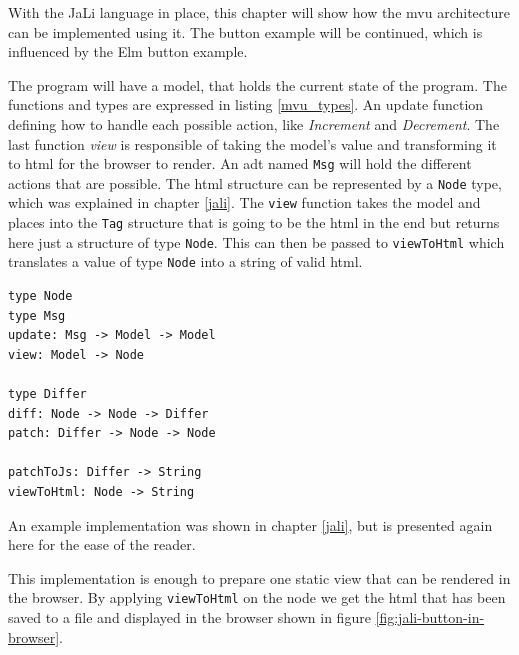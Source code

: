 With the JaLi language in place, this chapter will show how the \gls{mvu} architecture can be implemented using it. The button example will be continued, which is influenced by the Elm button example.

The program will have a model, that holds the current state of the program. The functions and types are expressed in listing \ref{mvu_types}. An update function defining how to handle each possible action, like \textit{Increment} and \textit{Decrement}. The last function \textit{view} is responsible of taking the model's value and transforming it to \gls{html} for the browser to render.
An \gls{adt} named \texttt{Msg} will hold the different actions that are possible. The \gls{html} structure can be represented by a \texttt{Node} type, which was explained in chapter \ref{jali}.
The \texttt{view} function takes the model and places into the \texttt{Tag} structure that is going to be the \gls{html} in the end but returns here just a structure of type \texttt{Node}. This can then be passed to \texttt{viewToHtml} which translates a value of type \texttt{Node} into a string of valid \gls{html}.

\begin{lstlisting}[columns=fullflexible, label={mvu_types}, language=Other, caption=Pseudo code to show functions and types]
type Node
type Msg
update: Msg -> Model -> Model
view: Model -> Node 

type Differ
diff: Node -> Node -> Differ
patch: Differ -> Node -> Node

patchToJs: Differ -> String
viewToHtml: Node -> String
\end{lstlisting}

An example implementation was shown in chapter \ref{jali}, but is presented again here for the ease of the reader. 



This implementation is enough to prepare one static view that can be rendered in the browser. By applying \texttt{viewToHtml} on the node we get the \gls{html} that has been saved to a file and displayed in the browser shown in figure \ref{fig:jali-button-in-browser}.

